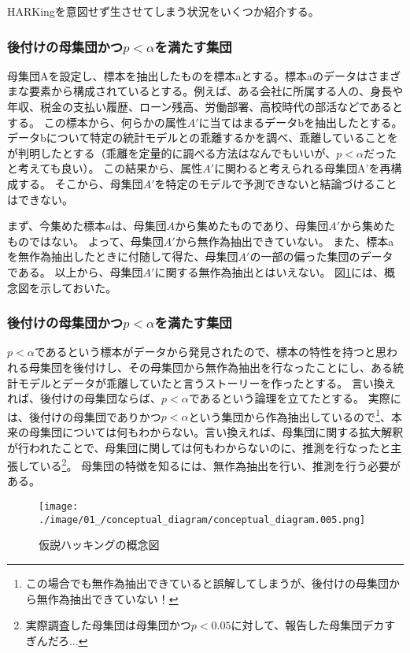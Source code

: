 HARKingを意図せず生させてしまう状況をいくつか紹介する。
\subsubsection{後付けの母集団かつ$p<\alpha$を満たす集団}
母集団Aを設定し、標本を抽出したものを標本aとする。標本aのデータはさまざまな要素から構成されているとする。例えば、ある会社に所属する人の、身長や年収、税金の支払い履歴、ローン残高、労働部署、高校時代の部活などであるとする。
この標本から、何らかの属性$A'$に当てはまるデータbを抽出したとする。
データbについて特定の統計モデルとの乖離するかを調べ、乖離していることをが判明したとする（乖離を定量的に調べる方法はなんでもいいが、$p<\alpha$だったと考えても良い）。
この結果から、属性$A'$に関わると考えられる母集団A'を再構成する。
そこから、母集団$A'$を特定のモデルで予測できないと結論づけることはできない。

まず、今集めた標本$a$は、母集団$A$から集めたものであり、母集団$A'$から集めたものではない。
よって、母集団$A'$から無作為抽出できていない。
また、標本aを無作為抽出したときに付随して得た、母集団$A'$の一部の偏った集団のデータである。
以上から、母集団$A'$に関する無作為抽出とはいえない。
図\ref{fig:conceptual_diagram_HARKing}には、概念図を示しておいた。

\subsubsection{後付けの母集団かつ$p<\alpha$を満たす集団}
$p<\alpha$であるという標本がデータから発見されたので、標本の特性を持つと思われる母集団を後付けし、その母集団から無作為抽出を行なったことにし、ある統計モデルとデータが乖離していたと言うストーリーを作ったとする。
言い換えれば、後付けの母集団ならば、$p<\alpha$であるという論理を立てたとする。
実際には、後付けの母集団でありかつ$p<\alpha$という集団から作為抽出しているので\footnote{この場合でも無作為抽出できていると誤解してしまうが、後付けの母集団から無作為抽出できていない！}、本来の母集団については何もわからない。言い換えれば、母集団に関する拡大解釈が行われたことで、母集団に関しては何もわからないのに、推測を行なったと主張している\footnote{実際調査した母集団は母集団かつ$p<0.05$に対して、報告した母集団デカすぎんだろ...}。
母集団の特徴を知るには、無作為抽出を行い、推測を行う必要がある。

\begin{figure}
    \begin{center}
        \texttt{[image: ./image/01\_/conceptual\_diagram/conceptual\_diagram.005.png]}
        \caption{仮説ハッキングの概念図}
        \label{fig:conceptual_diagram_HARKing}
    \end{center}
\end{figure}
    


